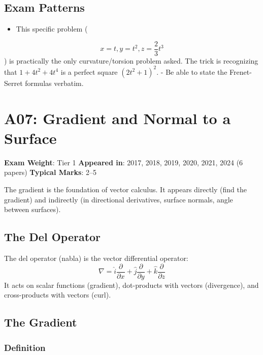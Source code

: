 \documentclass[
]{article}
\providecommand{\tightlist}{%
  \setlength{\itemsep}{0pt}\setlength{\parskip}{0pt}}
\renewenvironment{quote}
  {\begin{tcolorbox}[
     colback=calloutbg,
     colframe=calloutframe,
     colupper=callouttext,
     arc=3pt,
     boxrule=0.5pt,
     leftrule=0.5pt,
     borderline west={3pt}{0pt}{calloutaccent},
     left=8pt,
     right=8pt,
     top=6pt,
     bottom=6pt
   ]}
  {\end{tcolorbox}}
\begin{document}
\subsection{Exam Patterns}\label{exam-patterns-5}

\begin{itemize}
\tightlist
\item
  This specific problem (
\end{itemize}
\[
x=t, y=t^2, z=\frac{2}{3}t^3
\]
) is practically the only curvature/torsion problem asked. The trick is
recognizing that \(1 + 4t^2 + 4t^4\) is a perfect square
\((2t^2 + 1)^2\). - Be able to state the Frenet-Serret formulas
verbatim.

\section{A07: Gradient and Normal to a
Surface}\label{a07-gradient-and-normal-to-a-surface}

\begin{quote}
\textbf{Exam Weight}: Tier 1 \textbar{} \textbf{Appeared in}: 2017,
2018, 2019, 2020, 2021, 2024 (6 papers) \textbar{} \textbf{Typical
Marks}: 2--5
\end{quote}

The gradient is the foundation of vector calculus. It appears directly
(find the gradient) and indirectly (in directional derivatives, surface
normals, angle between surfaces).

\subsection{The Del Operator}\label{the-del-operator}

The del operator (nabla) is the vector differential operator:
\[
\nabla = \hat{i}\frac{\partial}{\partial x} + \hat{j}\frac{\partial}{\partial y} + \hat{k}\frac{\partial}{\partial z}
\]
It acts on scalar functions (gradient), dot-products with vectors
(divergence), and cross-products with vectors (curl).

\subsection{The Gradient}\label{the-gradient}

\subsubsection{Definition}\label{definition}
\end{document}

